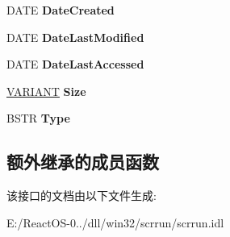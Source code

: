 \begin{DoxyCompactItemize}
\item 
\mbox{\label{interface_scripting_1_1_i_file_aa2b6d8ea0da0465bd5d1de03ec714e1b}} 
D\+A\+TE {\bfseries Date\+Created}
\item 
\mbox{\label{interface_scripting_1_1_i_file_a8cf67e94c26661167230eeede5136da4}} 
D\+A\+TE {\bfseries Date\+Last\+Modified}
\item 
\mbox{\label{interface_scripting_1_1_i_file_a181e604f4e57cfa76fa6408347bc9b80}} 
D\+A\+TE {\bfseries Date\+Last\+Accessed}
\item 
\mbox{\label{interface_scripting_1_1_i_file_a1765e525c994798a7180c021f2c911f1}} 
\hyperlink{structtag_v_a_r_i_a_n_t}{V\+A\+R\+I\+A\+NT} {\bfseries Size}
\item 
\mbox{\label{interface_scripting_1_1_i_file_a08d5305e9bdb4a67dae84f9d28d9a12c}} 
B\+S\+TR {\bfseries Type}
\end{DoxyCompactItemize}
\subsection*{额外继承的成员函数}


该接口的文档由以下文件生成\+:\begin{DoxyCompactItemize}
\item 
E\+:/\+React\+O\+S-\/0../dll/win32/scrrun/scrrun.\+idl\end{DoxyCompactItemize}
